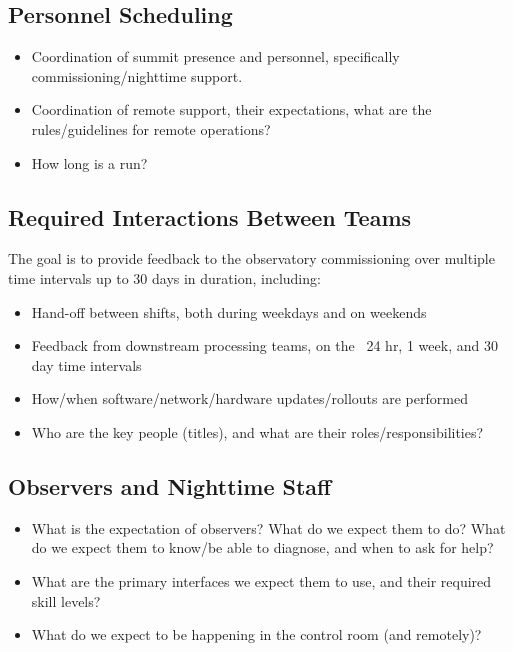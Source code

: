 \documentclass[SE,authoryear,toc]{lsstdoc}
\begin{document}
\subsection{Personnel Scheduling}
\begin{itemize}
\item Coordination of summit presence and personnel, specifically commissioning/nighttime support. 
\item Coordination of remote support, their expectations, what are the rules/guidelines for remote operations?
\item How long is a run?
\end{itemize}

\subsection{Required Interactions Between Teams}
The goal is to provide feedback to the observatory commissioning over multiple time intervals up to 30 days in duration, including:
\begin{itemize}
\item Hand-off between shifts, both during weekdays and on weekends
\item Feedback from downstream processing teams, on the ~24 hr, 1 week, and 30 day time intervals
\item How/when software/network/hardware updates/rollouts are performed
\item Who are the key people (titles), and what are their roles/responsibilities?
\end{itemize}

\subsection{Observers and Nighttime Staff}
\begin{itemize}
\item What is the expectation of observers? What do we expect them to do? 
      What do we expect them to know/be able to diagnose, and when to ask for help?
\item What are the primary interfaces we expect them to use, and their required skill levels?
\item What do we expect to be happening in the control room (and remotely)?
\end{itemize}
\end{document}
